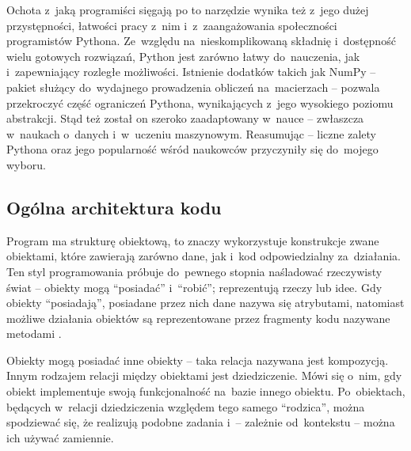 Ochota z~jaką programiści sięgają po to narzędzie wynika też z~jego dużej przystępności,
  łatwości pracy z~nim i~z~zaangażowania społeczności programistów Pythona.
Ze~względu na~nieskomplikowaną składnię i~dostępność wielu gotowych rozwiązań, Python jest
  zarówno łatwy do~nauczenia, jak i~zapewniający rozległe możliwości.
Istnienie dodatków takich jak NumPy \--- pakiet służący do~wydajnego prowadzenia
  obliczeń na~macierzach \--- pozwala przekroczyć część ograniczeń Pythona, wynikających z~jego
  wysokiego poziomu abstrakcji.
Stąd też został on szeroko zaadaptowany w~nauce \--- zwłaszcza w~naukach o~danych i~w~uczeniu
  maszynowym.
Reasumując \--- liczne zalety Pythona oraz jego popularność wśród naukowców przyczyniły się
  do~mojego wyboru.

\subsection{Ogólna architektura kodu}\label{implementation:architecture}
Program \tesliper{} ma strukturę obiektową, to znaczy wykorzystuje konstrukcje zwane obiektami,
  które zawierają zarówno dane, jak i~kod odpowiedzialny za~działania.
Ten styl programowania próbuje do~pewnego stopnia naśladować rzeczywisty świat \---
  obiekty mogą \enquote{posiadać} i~\enquote{robić}; reprezentują rzeczy lub idee.
Gdy obiekty \enquote{posiadają}, posiadane przez nich dane nazywa się atrybutami,
  natomiast możliwe działania obiektów są reprezentowane przez fragmenty kodu nazywane metodami%
  .

Obiekty mogą posiadać inne obiekty \--- taka relacja nazywana jest kompozycją.
Innym rodzajem relacji między obiektami jest dziedziczenie.
Mówi się o~nim, gdy obiekt implementuje swoją funkcjonalność na~bazie innego obiektu.
Po~obiektach, będących w~relacji dziedziczenia względem tego samego \enquote{rodzica},
  można spodziewać się, że realizują podobne zadania i~\--- zależnie od~kontekstu \--- 
  można ich używać zamiennie.

